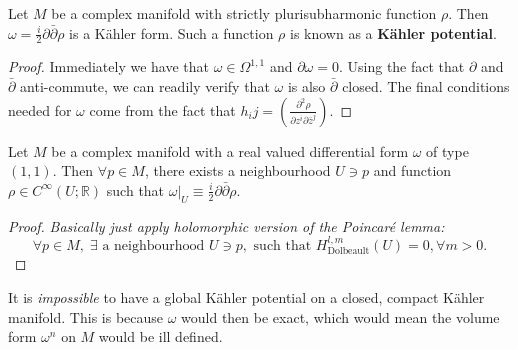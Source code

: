 \documentclass[11pt, final]{article}
\begin{document}
\begin{prop}
	Let $M$ be a complex manifold with strictly plurisubharmonic function $\rho$. Then $\omega = \tfrac{i}{2} \partial \bar{\partial} \rho$ is a K\"ahler form. Such a function $\rho$ is known as a \textbf{K\"ahler potential}.
\end{prop}
\begin{proof}
	Immediately we have that $\omega \in \Omega^{1,1}$ and $\partial \omega = 0$. Using the fact that $\partial$ and $\bar{\partial}$ anti-commute, we can readily verify that $\omega$ is also $\bar{\partial}$ closed. The final conditions needed for $\omega$ come from the fact that $h_ij = \left(\frac{\partial^2 \rho}{\partial z^i \partial \bar{z}^j} \right)$.
\end{proof}

\begin{prop}
	Let $M$ be a complex manifold with a real valued differential form $\omega$ of type $(1,1)$. Then $\forall p \in M$, there exists a neighbourhood $U \ni p$ and function $\rho \in C^\infty(U; \mathbb{R})$ such that $\omega|_U \equiv \tfrac{i}{2}\partial\bar{\partial} \rho$.
\end{prop}
\begin{proof}
	\textit{Basically just apply holomorphic version of the Poincar\'e lemma:}
		\begin{equation}
			\forall p \in M, \; \exists \text{ a neighbourhood } U \ni p, \text{ such that } H^{l,m}_{\mathrm{Dolbeault}}(U) = 0, \forall m > 0.
		\end{equation}
\end{proof}
\begin{remark}
	It is \textit{impossible} to have a global K\"ahler potential on a closed, compact K\"ahler manifold. This is because $\omega$ would then be exact, which would mean the volume form $\omega^n$ on $M$ would be ill defined.
\end{remark}
\end{document}
